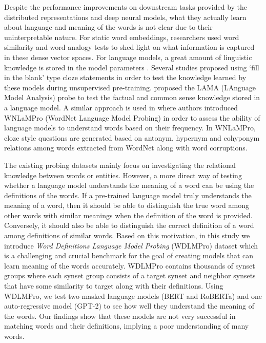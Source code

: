 \documentclass[11pt,a4paper]{article}
\begin{document}
Despite the performance improvements on downstream tasks provided by the distributed representations and deep neural models, what they actually learn about language and meaning of the words is not clear due to their uninterpretable nature. For static word embeddings, researchers used word similarity \cite{hill15simlex} and word analogy \cite{gladkova16analogy} tests to shed light on what information is captured in these dense vector spaces. For language models, a great amount of linguistic knowledge is stored in the model parameters \cite{peters18dissecting}. Several studies proposed using `fill in the blank' type cloze statements in order to test the knowledge learned by these models during unsupervised pre-training. \cite{petroni19LMasKB} proposed the LAMA (LAnguage Model Analysis) probe to test the factual and common sense knowledge stored in a language model. A similar approach is used in \cite{Schick20rareWords} where authors introduced WNLaMPro (WordNet Language Model Probing) in order to assess the ability of language models to understand words based on their frequency. In WNLaMPro, cloze style questions are generated based on antonym, hypernym and cohyponym relations among words extracted from WordNet along with word corruptions.

The existing probing datasets mainly focus on investigating the relational knowledge between words or entities. However, a more direct way of testing whether a language model understands the meaning of a word can be using the definitions of the words. If a pre-trained language model truly understands the meaning of a word, then it should be able to distinguish the true word among other words with similar meanings when the definition of the word is provided. Conversely, it should also be able to distinguish the correct definition of a word among definitions of similar words. Based on this motivation, in this study we introduce 
\textit{Word Definitions Language Model Probing} (WDLMPro) dataset which is a challenging and crucial benchmark for the goal of creating models that can learn meaning of the words accurately. WDLMPro contains thousands of synset groups where each synset group consists of a target synset and neighbor synsets that have some similarity to target along with their definitions. Using WDLMPro, we test two masked language models (BERT and RoBERTa) and one auto-regressive model (GPT-2) to see how well they understand the meaning of the words. Our findings show that these models are not very successful in matching words and their definitions, implying a poor understanding of many words.
\end{document}
